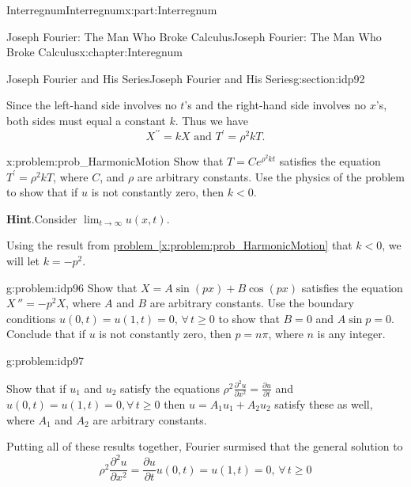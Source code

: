 \documentclass[oneside,10pt,]{book}
\newcommand{\blocktitlefont}{\relax}
\newcommand{\xreffont}{\relax}
\numberwithin{equation}{section}
\newcommand{\lt}{<}
\begin{document}
\begin{partptx}{Interregnum}{}{Interregnum}{}{}{x:part:Interregnum}
\begin{chapterptx}{Joseph Fourier: The Man Who Broke Calculus}{}{Joseph Fourier: The Man Who Broke Calculus}{}{}{x:chapter:Interegnum}
\begin{sectionptx}{Joseph Fourier and His Series}{}{Joseph Fourier and His Series}{}{}{g:section:idp92}
\begin{equation*}
\end{equation*}
%
\par
Since the left-hand side involves no \(t\)'s and the right-hand side involves no \(x\)'s, both sides must equal a constant \(k\). Thus we have%
\begin{equation*}
X^{\prime\prime}=k X\text{ and } T^\prime=\rho^2k T\text{.}
\end{equation*}
%
\begin{problem}{}{x:problem:prob_HarmonicMotion}%
 Show that \(T=Ce^{\rho^2kt}\) satisfies the equation \(T^\prime=\rho^2k T\), where \(C\), and \(\rho\) are arbitrary constants. Use the physics of the problem to show that if \(u\) is not constantly zero, then \(k\lt 0\).%
\par\smallskip%
\noindent\textbf{\blocktitlefont Hint}.\hypertarget{g:hint:idp95}{}\quad{}Consider \(\lim_{t\rightarrow\infty}u(x,t)\).%
\end{problem}
Using the result from \hyperref[x:problem:prob_HarmonicMotion]{problem~{\xreffont\ref{x:problem:prob_HarmonicMotion}}} that \(k\lt 0\), we will let \(k=-p^2\).%
\begin{problem}{}{g:problem:idp96}%
 Show that \(X=A\sin\left(px\right)+B\cos\left(px\right)\) satisfies the equation \(X\,''=-p^2X\), where \(A\) and \(B\) are arbitrary constants. Use the boundary conditions \(u(0,t)=u(1,t)=0\), \(\forall\,t\geq 0\) to show that \(B=0\) and \(A\sin p=0\). Conclude that if \(u\) is not constantly zero, then \(p=n\pi\), where \(n\) is any integer.%
\end{problem}
\begin{problem}{}{g:problem:idp97}%
%
\par
Show that if \(u_1\) and \(u_2\) satisfy the equations \(\rho^2\frac{\partial^2u}{\partial x^2}=\frac{\partial
u}{\partial t}\) and \(u(0,t)=u(1,t)=0, \forall\,t\geq
0\) then \(u=A_1u_1+A_2u_2\) satisfy these as well, where \(A_1\) and \(A_2\) are arbitrary constants.%
\end{problem}
 Putting all of these results together, Fourier surmised that the general solution to%
\begin{equation*}
\rho^2\frac{\partial^2u}{\partial x^2}=\frac{\partial u}{\partial t} u(0,t)=u(1,t)=0, \,\forall\,t\geq 0
\end{equation*}

\end{sectionptx}
\end{chapterptx}
\end{partptx}
\end{document}
